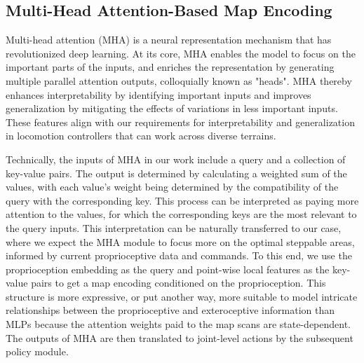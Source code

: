 \documentclass[9pt,twocolumn,twoside]{osajnl}
\begin{document}
\subsection*{Multi-Head Attention-Based Map Encoding}
Multi-head attention (MHA) \cite{NIPS2017_3f5ee243} is a neural representation mechanism that has revolutionized deep learning. At its core, MHA enables the model to focus on the important parts of the inputs, and enriches the representation by generating multiple parallel attention outputs, colloquially known as "heads". MHA thereby enhances interpretability by identifying important inputs and improves generalization by mitigating the effects of variations in less important inputs. These features align with our requirements for interpretability and generalization in locomotion controllers that can work across diverse terrains.

Technically, the inputs of MHA in our work include a query and a collection of key-value pairs. The output is determined by calculating a weighted sum of the values, with each value’s weight being determined by the compatibility of the query with the corresponding key. This process can be interpreted as paying more attention to the values, for which the corresponding keys are the most relevant to the query inputs. This interpretation can be naturally transferred to our case, where we expect the MHA module to focus more on the optimal steppable areas, informed by current proprioceptive data and commands. To this end, we use the proprioception embedding as the query and point-wise local features as the key-value pairs to get a map encoding conditioned on the proprioception. This structure is more expressive, or put another way, more suitable to model intricate relationships between the proprioceptive and exteroceptive information than MLPs because the attention weights paid to the map scans are state-dependent. The outputs of MHA are then translated to joint-level actions by the subsequent policy module.
\end{document}
